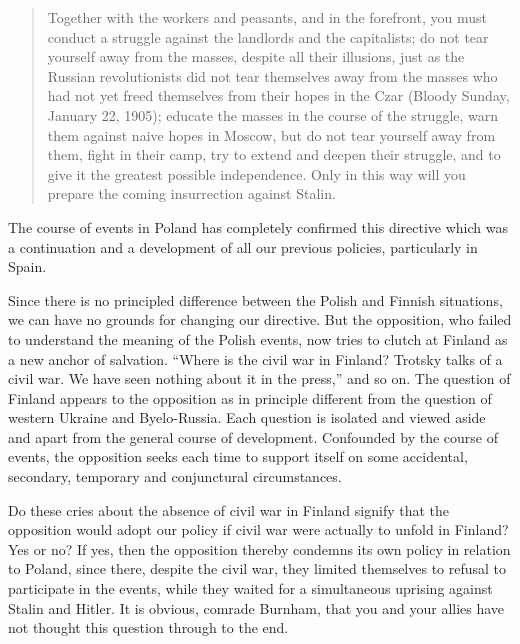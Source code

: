 \begin{quote}
  Together with the workers and peasants, and in the forefront, you must conduct a struggle against the landlords and the capitalists; do not tear yourself away from the masses, despite all their illusions, just as the Russian revolutionists did not tear themselves away from the masses who had not yet freed themselves from their hopes in the Czar (Bloody Sunday, January 22, 1905); educate the masses in the course of the struggle, warn them against naive hopes in Moscow, but do not tear yourself away from them, fight in their camp, try to extend and deepen their struggle, and to give it the greatest possible independence. Only in this way will you prepare the coming insurrection against Stalin.
\end{quote}

The course of events in Poland has completely confirmed this directive which was a continuation and a development of all our previous policies, particularly in Spain.

Since there is no principled difference between the Polish and Finnish situations, we can have no grounds for changing our directive. But the opposition, who failed to understand the meaning of the Polish events, now tries to clutch at Finland as a new anchor of salvation. “Where is the civil war in Finland? Trotsky talks of a civil war. We have seen nothing about it in the press,” and so on. The question of Finland appears to the opposition as in principle different from the question of western Ukraine and Byelo-Russia. Each question is isolated and viewed aside and apart from the general course of development. Confounded by the course of events, the opposition seeks each time to support itself on some accidental, secondary, temporary and conjunctural circumstances.

Do these cries about the absence of civil war in Finland signify that the opposition would adopt our policy if civil war were actually to unfold in Finland? Yes or no? If yes, then the opposition thereby condemns its own policy in relation to Poland, since there, despite the civil war, they limited themselves to refusal to participate in the events, while they waited for a simultaneous uprising against Stalin and Hitler. It is obvious, comrade Burnham, that you and your allies have not thought this question through to the end.

